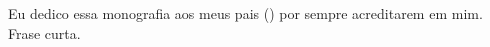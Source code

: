 \vspace*{\fill}
\begin{center}
    Eu dedico essa monografia aos meus pais () por sempre acreditarem em mim.
    \newline 
    Frase curta.
\end{center}
\vspace*{\fill}
\thispagestyle{empty}